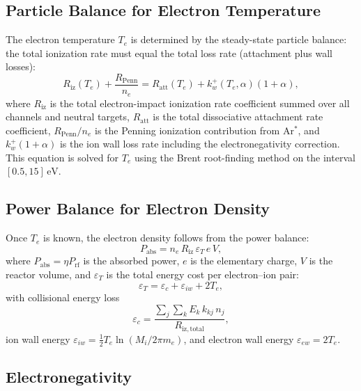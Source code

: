 \documentclass[11pt,a4paper]{report}
\newcommand{\eV}{\,\mathrm{eV}}
\newcommand{\Te}{T_e}
\begin{document}
\subsection{Particle Balance for Electron Temperature}

The electron temperature $\Te$ is determined by the steady-state particle balance: the total ionization rate must equal the total loss rate (attachment plus wall losses):
\begin{equation}
  \boxed{R_\mathrm{iz}(\Te) + \frac{R_\mathrm{Penn}}{n_e} = R_\mathrm{att}(\Te) + k_w^+(\Te,\alpha)(1+\alpha),}
  \label{eq:Te-balance}
\end{equation}
where $R_\mathrm{iz}$ is the total electron-impact ionization rate coefficient summed over all channels and neutral targets, $R_\mathrm{att}$ is the total dissociative attachment rate coefficient, $R_\mathrm{Penn}/n_e$ is the Penning ionization contribution from Ar$^*$, and $k_w^+(1+\alpha)$ is the ion wall loss rate including the electronegativity correction.  This equation is solved for $\Te$ using the Brent root-finding method  on the interval $[0.5, 15]\eV$.

\subsection{Power Balance for Electron Density}

Once $\Te$ is known, the electron density follows from the power balance:
\begin{equation}
  \boxed{P_\mathrm{abs} = n_e\, R_\mathrm{iz}\, \varepsilon_T\, e\, V,}
  \label{eq:power-balance}
\end{equation}
where $P_\mathrm{abs} = \eta P_\mathrm{rf}$ is the absorbed power, $e$ is the elementary charge, $V$ is the reactor volume, and $\varepsilon_T$ is the total energy cost per electron--ion pair:
\begin{equation}
  \varepsilon_T = \varepsilon_c + \varepsilon_{iw} + 2\Te,
  \label{eq:eps-T}
\end{equation}
with collisional energy loss
\begin{equation}
  \varepsilon_c = \frac{\sum_j \sum_k E_k\, k_{kj}\, n_j}{R_\mathrm{iz,total}},
  \label{eq:Ec}
\end{equation}
ion wall energy $\varepsilon_{iw} = \frac{1}{2}\Te \ln(M_i / 2\pi m_e)$, and electron wall energy $\varepsilon_{ew} = 2\Te$.

\subsection{Electronegativity}
\end{document}
